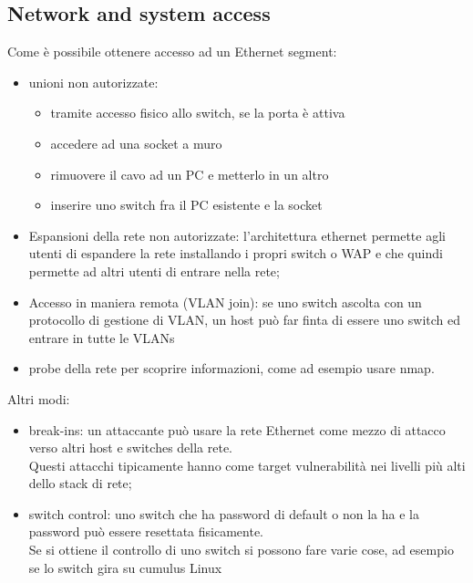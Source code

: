 \documentclass[12pt, oneside]{extbook} %
\begin{document}
\subsection{Network and system access}
Come è possibile ottenere accesso ad un Ethernet segment:
\begin{itemize}
    \item unioni non autorizzate:
    \begin{itemize}
        \item tramite accesso fisico allo switch, se la porta è attiva
        \item accedere ad una socket a muro
        \item rimuovere il cavo ad un PC e metterlo in un altro
        \item inserire uno switch fra il PC esistente e la socket
    \end{itemize}
    \item Espansioni della rete non autorizzate: l'architettura ethernet permette agli utenti di espandere la rete installando i propri switch o WAP e che quindi permette ad altri utenti di entrare nella rete;
    \item Accesso in maniera remota (VLAN join): se uno switch ascolta con un protocollo di gestione di VLAN, un host può far finta di essere uno switch ed entrare in tutte le VLANs 
    \item probe della rete per scoprire informazioni, come ad esempio usare nmap.
\end{itemize}

Altri modi:
\begin{itemize}
    \item break-ins: un attaccante può usare la rete Ethernet come mezzo di attacco verso altri host e switches della rete.
    \\Questi attacchi tipicamente hanno come target vulnerabilità nei livelli più alti dello stack di rete;
    \item switch control: uno switch che ha password di default o non la ha e la password può essere resettata fisicamente.
    \\Se si ottiene il controllo di uno switch si possono fare varie cose, ad esempio se lo switch gira su cumulus Linux
\end{itemize}
\end{document}
